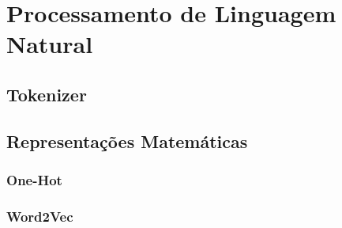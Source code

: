 \section{Processamento de Linguagem Natural}

\subsection{Tokenizer}

\subsection{Representações Matemáticas}

\subsubsection{One-Hot}

\subsubsection{Word2Vec}
